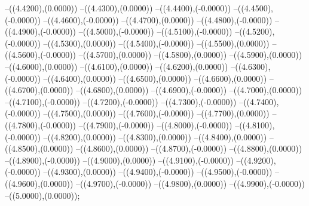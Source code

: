 {	--({\sx*(4.4200)},{\sy*(0.0000)})
	--({\sx*(4.4300)},{\sy*(0.0000)})
	--({\sx*(4.4400)},{\sy*(-0.0000)})
	--({\sx*(4.4500)},{\sy*(-0.0000)})
	--({\sx*(4.4600)},{\sy*(-0.0000)})
	--({\sx*(4.4700)},{\sy*(0.0000)})
	--({\sx*(4.4800)},{\sy*(-0.0000)})
	--({\sx*(4.4900)},{\sy*(-0.0000)})
	--({\sx*(4.5000)},{\sy*(-0.0000)})
	--({\sx*(4.5100)},{\sy*(-0.0000)})
	--({\sx*(4.5200)},{\sy*(-0.0000)})
	--({\sx*(4.5300)},{\sy*(0.0000)})
	--({\sx*(4.5400)},{\sy*(-0.0000)})
	--({\sx*(4.5500)},{\sy*(0.0000)})
	--({\sx*(4.5600)},{\sy*(-0.0000)})
	--({\sx*(4.5700)},{\sy*(0.0000)})
	--({\sx*(4.5800)},{\sy*(0.0000)})
	--({\sx*(4.5900)},{\sy*(0.0000)})
	--({\sx*(4.6000)},{\sy*(0.0000)})
	--({\sx*(4.6100)},{\sy*(0.0000)})
	--({\sx*(4.6200)},{\sy*(0.0000)})
	--({\sx*(4.6300)},{\sy*(-0.0000)})
	--({\sx*(4.6400)},{\sy*(0.0000)})
	--({\sx*(4.6500)},{\sy*(0.0000)})
	--({\sx*(4.6600)},{\sy*(0.0000)})
	--({\sx*(4.6700)},{\sy*(0.0000)})
	--({\sx*(4.6800)},{\sy*(0.0000)})
	--({\sx*(4.6900)},{\sy*(-0.0000)})
	--({\sx*(4.7000)},{\sy*(0.0000)})
	--({\sx*(4.7100)},{\sy*(-0.0000)})
	--({\sx*(4.7200)},{\sy*(-0.0000)})
	--({\sx*(4.7300)},{\sy*(-0.0000)})
	--({\sx*(4.7400)},{\sy*(-0.0000)})
	--({\sx*(4.7500)},{\sy*(0.0000)})
	--({\sx*(4.7600)},{\sy*(-0.0000)})
	--({\sx*(4.7700)},{\sy*(0.0000)})
	--({\sx*(4.7800)},{\sy*(-0.0000)})
	--({\sx*(4.7900)},{\sy*(-0.0000)})
	--({\sx*(4.8000)},{\sy*(-0.0000)})
	--({\sx*(4.8100)},{\sy*(-0.0000)})
	--({\sx*(4.8200)},{\sy*(0.0000)})
	--({\sx*(4.8300)},{\sy*(0.0000)})
	--({\sx*(4.8400)},{\sy*(0.0000)})
	--({\sx*(4.8500)},{\sy*(0.0000)})
	--({\sx*(4.8600)},{\sy*(0.0000)})
	--({\sx*(4.8700)},{\sy*(-0.0000)})
	--({\sx*(4.8800)},{\sy*(0.0000)})
	--({\sx*(4.8900)},{\sy*(-0.0000)})
	--({\sx*(4.9000)},{\sy*(0.0000)})
	--({\sx*(4.9100)},{\sy*(-0.0000)})
	--({\sx*(4.9200)},{\sy*(-0.0000)})
	--({\sx*(4.9300)},{\sy*(0.0000)})
	--({\sx*(4.9400)},{\sy*(-0.0000)})
	--({\sx*(4.9500)},{\sy*(-0.0000)})
	--({\sx*(4.9600)},{\sy*(0.0000)})
	--({\sx*(4.9700)},{\sy*(-0.0000)})
	--({\sx*(4.9800)},{\sy*(0.0000)})
	--({\sx*(4.9900)},{\sy*(-0.0000)})
	--({\sx*(5.0000)},{\sy*(0.0000)});
}
